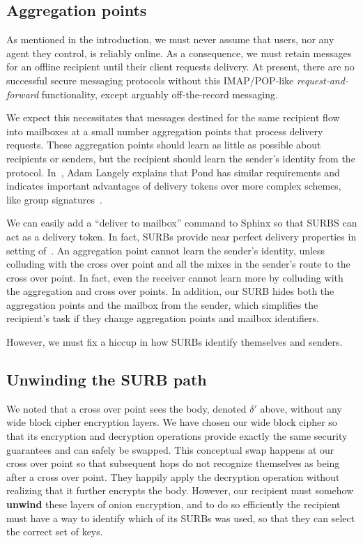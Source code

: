 \documentclass[twoside,letterpaper]{llncs}
\begin{document}
\subsection{Aggregation points}

As mentioned in the introduction, we must never assume that users,
nor any agent they control, is reliably online.  
As a consequence, we must retain messages for an offline recipient
until their client requests delivery.  
At present, there are no successful secure messaging protocols without
this IMAP/POP-like {\em request-and-forward} functionality, except
arguably off-the-record messaging. 

We expect this necessitates that messages destined for the same
recipient flow into mailboxes at a small number aggregation points
that process delivery requests.  These aggregation points should
learn as little as possible about recipients or senders, but the
recipient should learn the sender's identity from the protocol.
In~\cite{agl-pond-hmac}, Adam Langely explains that Pond has similar
requirements and indicates important advantages of delivery tokens
over more complex schemes, like group signatures~\cite{VLR,BBS}.

We can easily add a ``deliver to mailbox'' command to Sphinx so that SURBS
can act as a delivery token.  In fact, SURBs provide near perfect
delivery properties in setting of~\cite{warner-delivery}.
An aggregation point cannot learn the sender's identity, unless
colluding with the cross over point and all the mixes in the 
sender's route to the cross over point.  
In fact, even the receiver cannot learn more by colluding with
the aggregation and cross over points.  In addition, our SURB
hides both the aggregation points and the mailbox from the sender,
which simplifies the recipient's task if they change aggregation
points and mailbox identifiers.

However, we must fix a hiccup in how SURBs identify themselves
and senders.

\subsection{Unwinding the SURB path}

We noted that a cross over point sees the body, denoted $\delta'$
above, without any wide block cipher encryption layers.  We have
chosen our wide block cipher so that its encryption and decryption
operations provide exactly the same security guarantees and can
safely be swapped.  This conceptual swap happens at our cross over
point so that subsequent hops do not recognize themselves as being
after a cross over point.  They happily apply the decryption
operation without realizing that it further encrypts the body.
However, our recipient must somehow {\bf unwind} these layers of
onion encryption, and to do so efficiently the recipient must have
a way to identify which of its SURBs was used, so that they
can select the correct set of keys.
\end{document}
